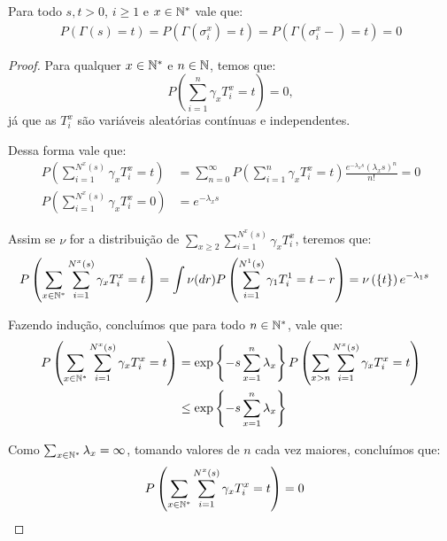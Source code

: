 \begin{proposicao}
  \label{prop:gamma-dist-continua}
  Para todo $s, t > 0$, $i \geq 1$ e $x \in {\mathbb{N^*}}$ vale que:
  \begin{align*}
    P(\Gamma(s) = t) = P(\Gamma(\sigma^x_i) = t) =
    P(\Gamma(\sigma^x_i-) = t) = 0
  \end{align*}
\end{proposicao}
\begin{proof}
  Para qualquer $x \in {\mathbb{N^*}}$ e $n \in {\mathbb{N}}$, temos que:
  \begin{displaymath}
    P\left(\sum_{i = 1}^n \gamma_x T_i^x = t\right) = 0,
  \end{displaymath}
  já que as $T_i^x$ são variáveis aleatórias contínuas e
  independentes.

  Dessa forma vale que:
  \begin{align*}
    P\left(\sum_{i = 1}^{N^x(s)} \gamma_x T_i^x = t\right) 
    &= \sum_{n = 0}^{\infty}
    P\left(\sum_{i = 1}^n \gamma_x T_i^x = t\right)
    \frac{e^{-\lambda_x s} (\lambda_x s)^n}{n!} = 0\\
    P\left(\sum_{i = 1}^{N^x(s)} \gamma_x T_i^x = 0\right) 
    &= e^{-\lambda_x s}
  \end{align*}

  Assim se $\nu$ for a distribuição de $\sum_{x \geq 2} \sum_{i =
    1}^{N^x(s)} \gamma_x T_i^x$, teremos que:
  \begin{align*}
    P\left(\sum_{x \in {\mathbb{N^*}}}\sum_{i = 1}^{N^x(s)} \gamma_x T_i^x = t\right) 
    &= \int \nu(dr) P\left(\sum_{i = 1}^{N^1(s)} \gamma_1 T_i^1 = t - r\right) 
    = \nu\left( \{ t\} \right) e^{-\lambda_1 s}
  \end{align*}

  Fazendo indução, concluímos que para todo $n \in {\mathbb{N^*}}$, vale que:
  \begin{align*}
    P\left(\sum_{x \in {\mathbb{N^*}}}\sum_{i = 1}^{N^x(s)} \gamma_x T_i^x = t\right) 
    &= \exp\left\{ -s \sum_{x = 1}^n \lambda_x \right\}
    P\left(\sum_{x > n} \sum_{i = 1}^{N^x(s)} \gamma_x T_i^x =
      t\right) \\
    &\leq \exp\left\{ -s \sum_{x = 1}^n \lambda_x \right\}
  \end{align*}

  Como $\sum_{x \in {\mathbb{N^*}}} \lambda_x = \infty$, tomando valores de $n$
  cada vez maiores, concluímos que:
  \begin{align*}
    P\left(\sum_{x \in {\mathbb{N^*}}}\sum_{i = 1}^{N^x(s)} \gamma_x T_i^x = t\right) 
    &= 0
  \end{align*}


\end{proof}
